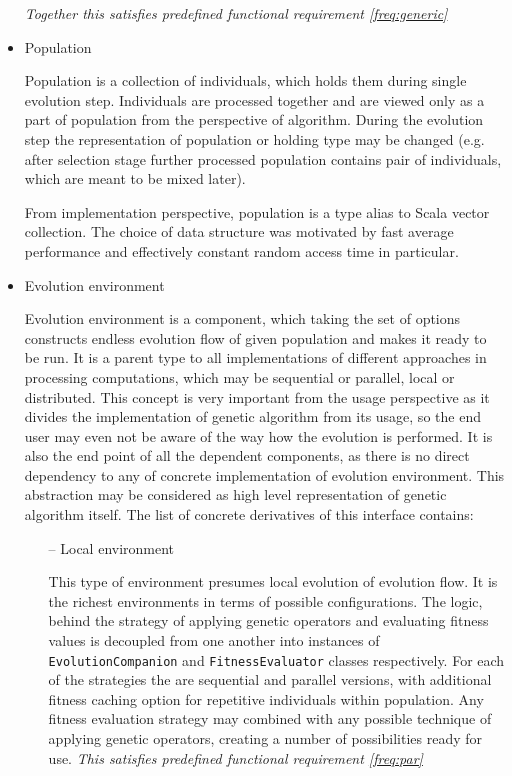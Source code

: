 \begin{itemize}
\smallskip \textit{Together this satisfies predefined functional requirement \ref{freq:generic}}

\medbreak

\item
Population

Population is a collection of individuals, which holds them during single evolution step. Individuals are processed together and are viewed only as a part of population from the perspective of algorithm. During the evolution step the representation of population or holding type may be changed (e.g. after selection stage further processed population contains pair of individuals, which are meant to be mixed later).

From implementation perspective, population is a type alias to Scala vector collection. The choice of data structure was motivated by fast average performance and effectively constant random access time in particular.
\medbreak

\item
Evolution environment

Evolution environment is a component, which taking the set of options constructs endless evolution flow of given population and makes it ready to be run. It is a parent type to all implementations of different approaches in processing computations, which may be sequential or parallel, local or distributed. This concept is very important from the usage perspective as it divides the implementation of genetic algorithm from its usage, so the end user may even not be aware of the way how the evolution is performed. It is also the end point of all the dependent components, as there is no direct dependency to any of concrete implementation of evolution environment. This abstraction may be considered as high level representation of genetic algorithm itself. The list of concrete derivatives of this interface contains:
\begin{itemize}
\item[--]
Local environment

This type of environment presumes local evolution of evolution flow. It is the richest environments in terms of possible configurations. The logic, behind the strategy of applying genetic operators and evaluating fitness values is decoupled from one another into instances of \texttt{EvolutionCompanion} and \texttt{FitnessEvaluator} classes respectively. For each of the strategies the are sequential and parallel versions, with additional fitness caching option for repetitive individuals within population. Any fitness evaluation strategy may combined with any possible technique of applying genetic operators, creating a number of possibilities ready for use.
\smallskip\textit{This satisfies predefined functional requirement \ref{freq:par}}
\medbreak


\end{itemize}
\end{itemize}
